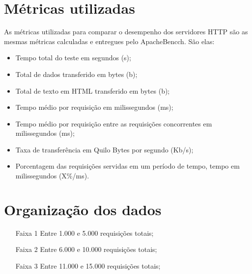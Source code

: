 \section{Métricas utilizadas}
As métricas utilizadas para comparar o desempenho dos servidores HTTP são as 
mesmas métricas calculadas e entregues pelo ApacheBencch. São elas:
\begin{itemize}
	\item Tempo total do teste em segundos (s);
	\item Total de dados transferido em bytes (b);
	\item Total de texto em HTML transferido em bytes (b);
	\item Tempo médio por requisição em milissegundos (ms);
	\item Tempo médio por requisição entre as requisições concorrentes em 
	milissegundos (ms);
	\item Taxa de transferência em Quilo Bytes por segundo (Kb/s);
	\item Porcentagem das requisições servidas em um período de tempo, tempo em 
	milissegundos (X\%/ms).
\end{itemize}

\section{Organização dos dados}

\begin{itemize}
	\item[Faixa 1] Entre 1.000 e 5.000 requisições totais;
	\item[Faixa 2] Entre 6.000 e 10.000 requisições totais;
	\item[Faixa 3] Entre 11.000 e 15.000 requisições totais;
\end{itemize}
